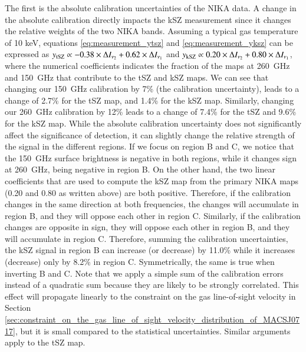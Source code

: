 \documentclass[twocolumn,traditabstract]{aa}
\begin{document}
The first is the absolute calibration uncertainties of the NIKA data. A change in the absolute calibration directly impacts the kSZ measurement since it changes the relative weights of the two NIKA bands. Assuming a typical gas temperature of 10 keV, equations \ref{eq:measurement_ytsz} and \ref{eq:measurement_yksz} can be expressed as $y_{\rm tSZ} \propto -0.38 \times \Delta I_{\nu_2} + 0.62 \times \Delta I_{\nu_1}$ and $y_{\rm kSZ} \propto 0.20 \times \Delta I_{\nu_2} + 0.80 \times \Delta I_{\nu_1}$, where the numerical coefficients indicates the fraction of the maps at 260~GHz and 150~GHz that contribute to the tSZ and kSZ maps. We can see that changing our 150~GHz calibration by 7\% (the calibration uncertainty), leads to a change of 2.7\% for the tSZ map, and 1.4\% for the kSZ map. Similarly, changing our 260~GHz calibration by 12\% leads to a change of 7.4\% for the tSZ and 9.6\% for the kSZ map. While the absolute calibration uncertainty does not significantly affect the significance of detection, it can slightly change the relative strength of the signal in the different regions. If we focus on region B and C, we notice that the 150~GHz surface brightness is negative in both regions, while it changes sign at 260~GHz, being negative in region B. On the other hand, the two linear coefficients that are used to compute the kSZ map from the primary NIKA maps (0.20 and 0.80 as written above) are both positive. Therefore, if the calibration changes in the same direction at both frequencies, the changes will accumulate in region B, and they will oppose each other in region C. Similarly, if the calibration changes are opposite in sign, they will oppose each other in region B, and they will accumulate in region C. Therefore, summing the calibration uncertainties, the kSZ signal in region B can increase (or decrease) by 11.0\% while it increases (decrease) only by 8.2\% in region C. Symmetrically, the same is true when inverting B and C. Note that we apply a simple sum of the calibration errors instead of a quadratic sum because they are likely to be strongly correlated. This effect will propagate linearly to the constraint on the gas line-of-sight velocity in Section \ref{sec:constraint_on_the_gas_line_of_sight_velocity_distribution_of_MACSJ0717}, but it is small compared to the statistical uncertainties. Similar arguments apply to the tSZ map.
\end{document}
